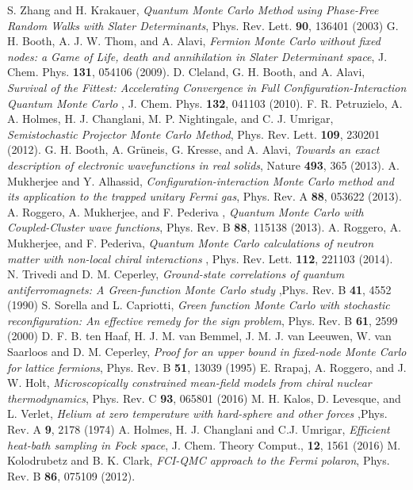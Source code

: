 \begin{thebibliography}{99.}
S. Zhang and H. Krakauer, \emph{Quantum Monte Carlo Method using Phase-Free Random Walks with Slater Determinants}, Phys. Rev. Lett. {\bf 90}, 136401 (2003)
G. H. Booth, A. J. W. Thom, and A. Alavi, \emph{Fermion Monte Carlo without fixed nodes: a Game of Life, death and annihilation in Slater Determinant space}, J. Chem. Phys. {\bf 131}, 054106 (2009).
D. Cleland, G. H. Booth, and A. Alavi, \emph{ Survival of the Fittest: Accelerating Convergence in Full Configuration-Interaction Quantum Monte Carlo },  J. Chem. Phys. {\bf 132}, 041103 (2010).
F. R. Petruzielo, A. A. Holmes, H. J. Changlani, M. P.
Nightingale, and C. J. Umrigar, \emph{Semistochastic Projector Monte Carlo Method}, Phys. Rev. Lett. {\bf 109},
230201 (2012).
G. H. Booth, A. Gr\"uneis, G. Kresse, and A. Alavi,\emph{ Towards an exact description of electronic wavefunctions in real solids}, Nature
{\bf 493}, 365 (2013).
A. Mukherjee and Y. Alhassid, \emph{Configuration-interaction Monte Carlo method and its application to the trapped unitary Fermi gas},
 Phys. Rev. A {\bf 88}, 053622 (2013).
A. Roggero, A. Mukherjee, and F. Pederiva , \emph{Quantum Monte Carlo with Coupled-Cluster wave functions},
 Phys. Rev. B {\bf 88}, 115138 (2013).
A. Roggero, A. Mukherjee, and F. Pederiva, \emph{Quantum Monte Carlo calculations of neutron matter with non-local chiral interactions },
 Phys. Rev. Lett. {\bf 112}, 221103 (2014).
N. Trivedi and D. M. Ceperley, \emph{Ground-state correlations of quantum antiferromagnets: A Green-function Monte Carlo study} ,Phys. Rev. B {\bf 41}, 4552 (1990)
S. Sorella and L. Capriotti, \emph{Green function Monte Carlo with stochastic reconfiguration: An effective remedy for the sign problem}, Phys. Rev. B {\bf 61}, 2599 (2000)
D. F. B. ten Haaf, H. J. M. van Bemmel, J. M. J. van Leeuwen, W. van Saarloos and D. M. Ceperley, \emph{Proof for an upper bound in fixed-node Monte Carlo for lattice fermions}, Phys. Rev. B {\bf 51}, 13039 (1995)
E. Rrapaj, A. Roggero, and J. W. Holt, \emph{Microscopically constrained mean-field models from chiral nuclear thermodynamics}, Phys. Rev. C {\bf 93}, 065801 (2016)
M. H. Kalos, D. Levesque, and L. Verlet, \emph{Helium at zero temperature with hard-sphere and other forces} ,Phys. Rev. A {\bf 9}, 2178 (1974)
A. Holmes, H. J. Changlani and C.J. Umrigar, \emph{Efficient heat-bath sampling in Fock space}, J. Chem. Theory Comput., {\bf 12}, 1561 (2016) 
M. Kolodrubetz and B. K. Clark, \emph{FCI-QMC approach to the Fermi polaron}, Phys. Rev. B {\bf 86}, 075109 (2012).
\end{thebibliography}







